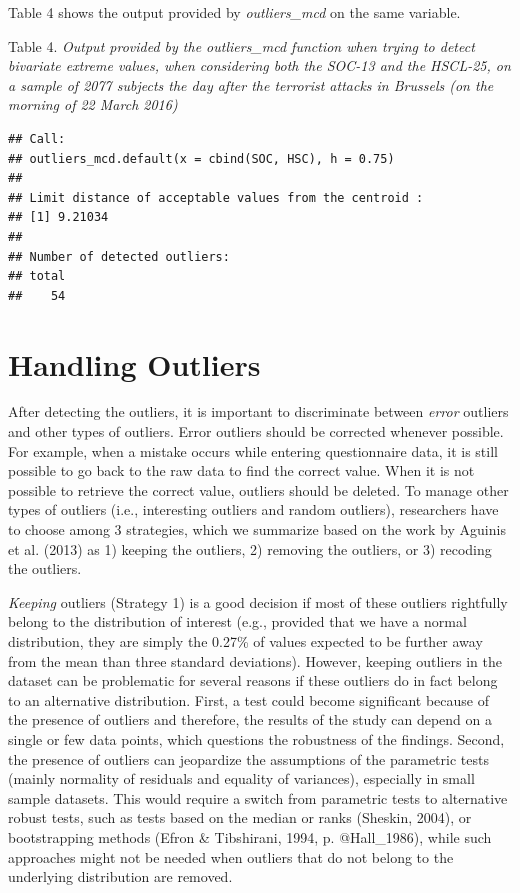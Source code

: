 \documentclass[man,floatsintext]{apa6}
\begin{document}
Table 4 shows the output provided by \emph{outliers\_mcd} on the same variable.

Table 4.
\emph{Output provided by the outliers\_mcd function when trying to detect bivariate extreme values, when considering both the SOC-13 and the HSCL-25, on a sample of 2077 subjects the day after the terrorist attacks in Brussels (on the morning of 22 March 2016)}

\begin{verbatim}
## Call:
## outliers_mcd.default(x = cbind(SOC, HSC), h = 0.75)
## 
## Limit distance of acceptable values from the centroid :
## [1] 9.21034
## 
## Number of detected outliers:
## total 
##    54
\end{verbatim}

\hypertarget{handling-outliers}{%
\section{Handling Outliers}\label{handling-outliers}}

After detecting the outliers, it is important to discriminate between \emph{error} outliers and other types of outliers. Error outliers should be corrected whenever possible. For example, when a mistake occurs while entering questionnaire data, it is still possible to go back to the raw data to find the correct value. When it is not possible to retrieve the correct value, outliers should be deleted. To manage other types of outliers (i.e., interesting outliers and random outliers), researchers have to choose among 3 strategies, which we summarize based on the work by Aguinis et al. (2013) as 1) keeping the outliers, 2) removing the outliers, or 3) recoding the outliers.

\emph{Keeping} outliers (Strategy 1) is a good decision if most of these outliers rightfully belong to the distribution of interest (e.g., provided that we have a normal distribution, they are simply the 0.27\% of values expected to be further away from the mean than three standard deviations). However, keeping outliers in the dataset can be problematic for several reasons if these outliers do in fact belong to an alternative distribution. First, a test could become significant because of the presence of outliers and therefore, the results of the study can depend on a single or few data points, which questions the robustness of the findings. Second, the presence of outliers can jeopardize the assumptions of the parametric tests (mainly normality of residuals and equality of variances), especially in small sample datasets. This would require a switch from parametric tests to alternative robust tests, such as tests based on the median or ranks (Sheskin, 2004), or bootstrapping methods (Efron \& Tibshirani, 1994, p. @Hall\_1986), while such approaches might not be needed when outliers that do not belong to the underlying distribution are removed.
\end{document}
